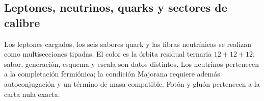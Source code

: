 \let\clearpage\relax

\endgroup
\begingroup
\let\chapter\section
\let\section\subsection
\let\subsection\subsubsection
\let\subsubsection\paragraph
\let\clearpage\relax

\endgroup

\section{Leptones, neutrinos, quarks y sectores de calibre}
Los leptones cargados, los seis sabores quark y las fibras neutrínicas se
realizan como multisecciones tipadas. El color es la órbita residual ternaria
\(12+12+12\); sabor, generación, esquema y escala son datos distintos. Los
neutrinos pertenecen a la completación fermiónica; la condición Majorana
requiere además autoconjugación y un término de masa compatible. Fotón y gluón
pertenecen a la carta nula exacta.

